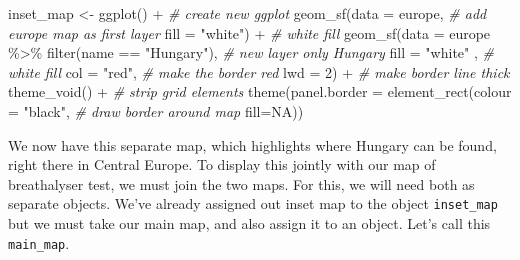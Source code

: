 \documentclass[
]{book}
\newenvironment{Shaded}{\begin{snugshade}}{\end{snugshade}}
\newcommand{\AttributeTok}[1]{\textcolor[rgb]{0.77,0.63,0.00}{#1}}
\newcommand{\CommentTok}[1]{\textcolor[rgb]{0.56,0.35,0.01}{\textit{#1}}}
\newcommand{\ConstantTok}[1]{\textcolor[rgb]{0.00,0.00,0.00}{#1}}
\newcommand{\DecValTok}[1]{\textcolor[rgb]{0.00,0.00,0.81}{#1}}
\newcommand{\FunctionTok}[1]{\textcolor[rgb]{0.00,0.00,0.00}{#1}}
\newcommand{\NormalTok}[1]{#1}
\newcommand{\OtherTok}[1]{\textcolor[rgb]{0.56,0.35,0.01}{#1}}
\newcommand{\SpecialCharTok}[1]{\textcolor[rgb]{0.00,0.00,0.00}{#1}}
\newcommand{\StringTok}[1]{\textcolor[rgb]{0.31,0.60,0.02}{#1}}
\begin{document}
\begin{Shaded}
\begin{Highlighting}[]
\NormalTok{inset\_map }\OtherTok{\textless{}{-}} \FunctionTok{ggplot}\NormalTok{() }\SpecialCharTok{+}  \CommentTok{\# create new ggplot }
  \FunctionTok{geom\_sf}\NormalTok{(}\AttributeTok{data =}\NormalTok{ europe,  }\CommentTok{\# add europe map as first layer}
          \AttributeTok{fill =} \StringTok{"white"}\NormalTok{) }\SpecialCharTok{+} \CommentTok{\# white fill }
  \FunctionTok{geom\_sf}\NormalTok{(}\AttributeTok{data =}\NormalTok{ europe }\SpecialCharTok{\%\textgreater{}\%} \FunctionTok{filter}\NormalTok{(name }\SpecialCharTok{==} \StringTok{"Hungary"}\NormalTok{), }\CommentTok{\# new layer only Hungary}
          \AttributeTok{fill =} \StringTok{"white"}\NormalTok{ ,  }\CommentTok{\# white fill}
          \AttributeTok{col =} \StringTok{"red"}\NormalTok{,   }\CommentTok{\# make the border red}
          \AttributeTok{lwd =} \DecValTok{2}\NormalTok{) }\SpecialCharTok{+}   \CommentTok{\# make border line thick}
  \FunctionTok{theme\_void}\NormalTok{() }\SpecialCharTok{+}  \CommentTok{\# strip grid elements}
  \FunctionTok{theme}\NormalTok{(}\AttributeTok{panel.border =} \FunctionTok{element\_rect}\NormalTok{(}\AttributeTok{colour =} \StringTok{"black"}\NormalTok{, }\CommentTok{\# draw border around map}
                                    \AttributeTok{fill=}\ConstantTok{NA}\NormalTok{)) }
\end{Highlighting}
\end{Shaded}

We now have this separate map, which highlights where Hungary can be found, right there in Central Europe. To display this jointly with our map of breathalyser test, we must join the two maps. For this, we will need both as separate objects. We've already assigned out inset map to the object \texttt{inset\_map} but we must take our main map, and also assign it to an object. Let's call this \texttt{main\_map}.
\end{document}
